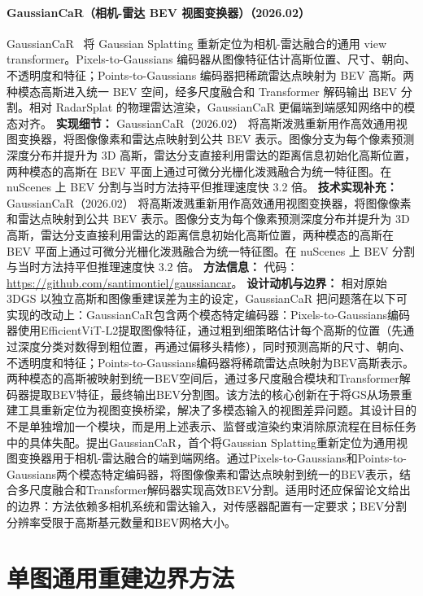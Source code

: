 \paragraph{GaussianCaR（相机-雷达 BEV 视图变换器）（2026.02）}
GaussianCaR~\cite{2602_08784} 将 Gaussian Splatting 重新定位为相机-雷达融合的通用 view transformer。Pixels-to-Gaussians 编码器从图像特征估计高斯位置、尺寸、朝向、不透明度和特征；Points-to-Gaussians 编码器把稀疏雷达点映射为 BEV 高斯。两种模态高斯进入统一 BEV 空间，经多尺度融合和 Transformer 解码输出 BEV 分割。相对 RadarSplat 的物理雷达渲染，GaussianCaR 更偏端到端感知网络中的模态对齐。
\textbf{实现细节：} GaussianCaR（2026.02） 将高斯泼溅重新用作高效通用视图变换器，将图像像素和雷达点映射到公共 BEV 表示。图像分支为每个像素预测深度分布并提升为 3D 高斯，雷达分支直接利用雷达的距离信息初始化高斯位置，两种模态的高斯在 BEV 平面上通过可微分光栅化泼溅融合为统一特征图。在 nuScenes 上 BEV 分割与当时方法持平但推理速度快 3.2 倍。
\textbf{技术实现补充：} GaussianCaR（2026.02） 将高斯泼溅重新用作高效通用视图变换器，将图像像素和雷达点映射到公共 BEV 表示。图像分支为每个像素预测深度分布并提升为 3D 高斯，雷达分支直接利用雷达的距离信息初始化高斯位置，两种模态的高斯在 BEV 平面上通过可微分光栅化泼溅融合为统一特征图。在 nuScenes 上 BEV 分割与当时方法持平但推理速度快 3.2 倍。 %
\textbf{方法信息：} 代码：\url{https://github.com/santimontiel/gaussiancar}。
\textbf{设计动机与边界：} 相对原始 3DGS 以独立高斯和图像重建误差为主的设定，GaussianCaR 把问题落在以下可实现的改动上：GaussianCaR包含两个模态特定编码器：Pixels-to-Gaussians编码器使用EfficientViT-L2提取图像特征，通过粗到细策略估计每个高斯的位置（先通过深度分类对数得到粗位置，再通过偏移头精修），同时预测高斯的尺寸、朝向、不透明度和特征；Points-to-Gaussians编码器将稀疏雷达点映射为BEV高斯表示。两种模态的高斯被映射到统一BEV空间后，通过多尺度融合模块和Transformer解码器提取BEV特征，最终输出BEV分割图。该方法的核心创新在于将GS从场景重建工具重新定位为视图变换桥梁，解决了多模态输入的视图差异问题。其设计目的不是单独增加一个模块，而是用上述表示、监督或渲染约束消除原流程在目标任务中的具体失配。提出GaussianCaR，首个将Gaussian Splatting重新定位为通用视图变换器用于相机-雷达融合的端到端网络。通过Pixels-to-Gaussians和Points-to-Gaussians两个模态特定编码器，将图像像素和雷达点映射到统一的BEV表示，结合多尺度融合和Transformer解码器实现高效BEV分割。适用时还应保留论文给出的边界：方法依赖多相机系统和雷达输入，对传感器配置有一定要求；BEV分割分辨率受限于高斯基元数量和BEV网格大小。

\section{单图通用重建边界方法}

